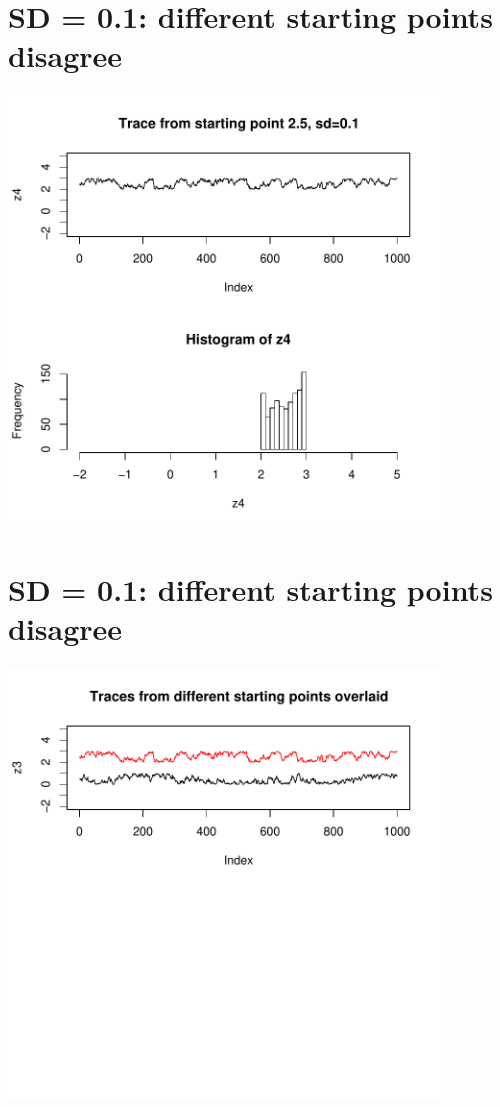 \section*{SD = 0.1: different starting points disagree}
\centerline{\includegraphics[height=4.5in]{figures/badtrace2.pdf}}

\es\bs
\section*{SD = 0.1: different starting points disagree}
\centerline{\includegraphics[height=4.5in]{figures/badtrace3.pdf}}

